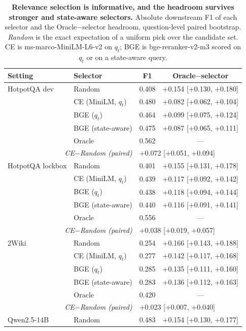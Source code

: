 \begin{table}[t]
\centering
\small
\caption{\textbf{Relevance selection is informative, and the headroom
survives stronger and state-aware selectors.} Absolute downstream F1 of
each selector and the Oracle$-$selector headroom, question-level paired
bootstrap. \emph{Random} is the exact expectation of a uniform pick over
the candidate set. CE is ms-marco-MiniLM-L6-v2 on $q_t$; BGE is
bge-reranker-v2-m3 scored on $q_t$ or on a state-aware query.}
\label{tab:selectors}
\begin{tabular}{llcc}
\toprule
\textbf{Setting} & \textbf{Selector} & \textbf{F1} & \textbf{Oracle$-$selector} \\
\midrule
HotpotQA dev & Random & 0.408 & +0.154 [+0.130, +0.180] \\
 & CE (MiniLM, $q_t$) & 0.480 & +0.082 [+0.062, +0.104] \\
 & BGE ($q_t$) & 0.464 & +0.099 [+0.075, +0.124] \\
 & BGE (state-aware) & 0.475 & +0.087 [+0.065, +0.111] \\
 & Oracle & 0.562 & --- \\
\multicolumn{2}{r}{\emph{CE$-$Random (paired)}} & \multicolumn{2}{l}{+0.072 [+0.051, +0.094]} \\
\midrule
HotpotQA lockbox & Random & 0.401 & +0.155 [+0.131, +0.178] \\
 & CE (MiniLM, $q_t$) & 0.439 & +0.117 [+0.092, +0.142] \\
 & BGE ($q_t$) & 0.438 & +0.118 [+0.094, +0.144] \\
 & BGE (state-aware) & 0.440 & +0.116 [+0.091, +0.141] \\
 & Oracle & 0.556 & --- \\
\multicolumn{2}{r}{\emph{CE$-$Random (paired)}} & \multicolumn{2}{l}{+0.038 [+0.019, +0.057]} \\
\midrule
2Wiki & Random & 0.254 & +0.166 [+0.143, +0.188] \\
 & CE (MiniLM, $q_t$) & 0.277 & +0.142 [+0.117, +0.168] \\
 & BGE ($q_t$) & 0.285 & +0.135 [+0.111, +0.160] \\
 & BGE (state-aware) & 0.283 & +0.136 [+0.112, +0.163] \\
 & Oracle & 0.420 & --- \\
\multicolumn{2}{r}{\emph{CE$-$Random (paired)}} & \multicolumn{2}{l}{+0.023 [+0.007, +0.040]} \\
\midrule
Qwen2.5-14B & Random & 0.483 & +0.154 [+0.130, +0.177] \\

\end{tabular}
\end{table}
